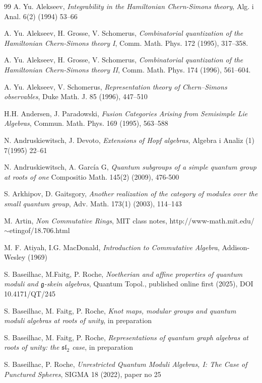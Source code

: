 \documentclass[11pt]{amsart}
\begin{document}
\begin{thebibliography}{99}
 A. Yu. Alekseev, {\it Integrability in the Hamiltonian Chern-Simons theory}, Alg. i Anal. 6(2) (1994) 53--66

 A. Yu. Alekseev, H. Grosse, V. Schomerus, {\it Combinatorial quantization of the Hamiltonian Chern-Simons theory I}, Comm. Math. Phys. 172 (1995), 317--358.

 A. Yu. Alekseev, H. Grosse, V. Schomerus, {\it Combinatorial quantization of the Hamiltonian Chern-Simons theory II}, Comm. Math. Phys. 174 (1996), 561--604.

 A. Yu. Alekseev, V. Schomerus, {\em Representation theory of Chern--Simons observables}, Duke Math. J. 85 (1996), 447--510

 H.H. Andersen, J. Paradowski, \emph{Fusion Categories Arising from Semisimple Lie Algebras}, Commun. Math. Phys. 169 (1995), 563--588

 N. Andruskiewitsch, J. Devoto, {\it Extensions of Hopf algebras}, Algebra i Analiz (1) 7(1995) 22--61

 N. Andruskiewitsch, A. García G, {\it Quantum subgroups of a simple quantum group at roots of one} Compositio Math. 145(2) (2009), 476-500

 S. Arkhipov, D. Gaitsgory, {\it Another realization of the category of modules over the small quantum group}, Adv. Math. 173(1) (2003), 114--143

 M. Artin, {\it Non Commutative Rings}, MIT class notes, http://www-math.mit.edu/$\sim$etingof/18.706.html

 M. F. Atiyah, I.G. MacDonald, {\it Introduction to Commutative Algebra}, Addison-Wesley (1969)

 S. Baseilhac, M.Faitg, P. Roche, {\em Noetherian and affine properties of quantum moduli and $\mathfrak{g}$-skein algebras}, Quantum Topol., published online first (2025), DOI 10.4171/QT/245

 S. Baseilhac, M. Faitg, P. Roche, {\it Knot maps, modular groups and quantum moduli algebras at roots of unity}, in preparation

 S. Baseilhac, M. Faitg, P. Roche, {\it Representations of quantum graph algebras at roots of unity: the $\mathfrak{sl}_2$ case}, in preparation

 S. Baseilhac, P. Roche, {\em Unrestricted Quantum Moduli Algebras, I: The Case of Punctured Spheres}, SIGMA 18 (2022), paper no 25


\end{thebibliography}
\end{document}
